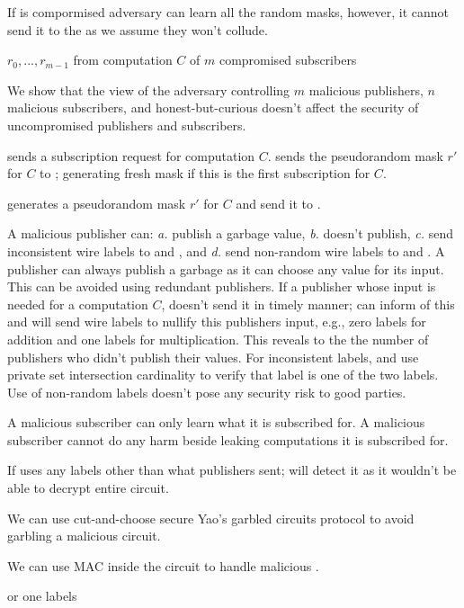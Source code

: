 If \garbler is compormised adversary can learn all the random masks, however,
it cannot send it to the \broker as we assume they won't collude. 

$r_0,...,r_{m-1}$ from computation $C$ of $m$
compromised subscribers

We show that the view of the adversary controlling $m$ malicious publishers,
$n$ malicious subscribers, and honest-but-curious \broker doesn't affect the
security of uncompromised publishers and subscribers.


\Adv sends a subscription request for computation $C$. \Sim sends the
pseudorandom mask $r'$ for $C$ to \Adv; generating fresh mask if this is the
first subscription for $C$.

\Sim generates a
pseudorandom mask $r'$ for $C$ and send it to \Adv. 

A malicious publisher can: \emph{a.} publish a garbage value, \emph{b.} doesn't
publish, \emph{c.} send inconsistent wire labels to \broker and \garbler, and
\emph{d.} send non-random wire labels to \broker and \garbler. A publisher can
always publish a garbage as it can choose any value for its input. This can be
avoided using redundant publishers. If a publisher whose input is needed for a
computation $C$, doesn't send it in timely manner; \broker can inform \garbler
of this and \garbler will send wire labels to nullify this publishers input,
e.g., zero labels for addition and one labels for multiplication. This reveals
to the \garbler the number of publishers who didn't publish their values. For
inconsistent labels, \broker and \garbler use private set intersection
cardinality to verify that \broker label is one of the two \garbler labels. Use
of non-random labels doesn't pose any security risk to good parties.

A malicious subscriber can only learn what it is subscribed for. A malicious
subscriber cannot do any harm beside leaking computations it is subscribed for.

If \garbler uses any labels other than what publishers sent; \broker will
detect it as it wouldn't be able to decrypt entire circuit. 

We can use cut-and-choose secure Yao's garbled circuits protocol to avoid
\garbler garbling a malicious circuit.

We can use MAC inside the circuit to handle malicious \broker.

or one labels


